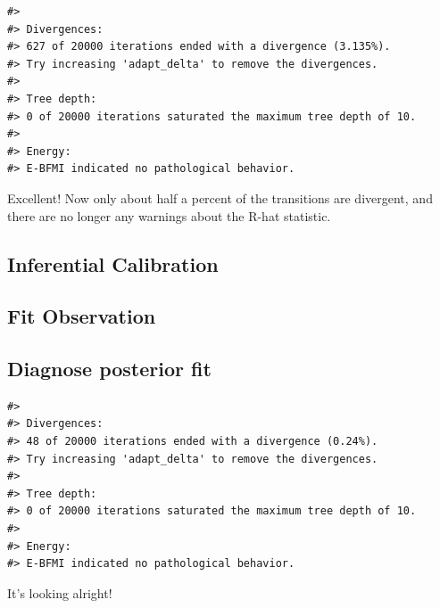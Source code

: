 \documentclass[11pt, oneside, openany]{scrbook}
\begin{document}
\begin{verbatim}
#> 
#> Divergences:
#> 627 of 20000 iterations ended with a divergence (3.135%).
#> Try increasing 'adapt_delta' to remove the divergences.
#> 
#> Tree depth:
#> 0 of 20000 iterations saturated the maximum tree depth of 10.
#> 
#> Energy:
#> E-BFMI indicated no pathological behavior.
\end{verbatim}

Excellent! Now only about half a percent of the transitions are divergent, and there are no longer any warnings about the R-hat statistic.

\hypertarget{inferential-calibration}{%
\subsection{Inferential Calibration}\label{inferential-calibration}}

\hypertarget{fit-observation}{%
\subsection{Fit Observation}\label{fit-observation}}

\hypertarget{diagnose-posterior-fit}{%
\subsection{Diagnose posterior fit}\label{diagnose-posterior-fit}}

\begin{verbatim}
#> 
#> Divergences:
#> 48 of 20000 iterations ended with a divergence (0.24%).
#> Try increasing 'adapt_delta' to remove the divergences.
#> 
#> Tree depth:
#> 0 of 20000 iterations saturated the maximum tree depth of 10.
#> 
#> Energy:
#> E-BFMI indicated no pathological behavior.
\end{verbatim}

It's looking alright!
\end{document}
